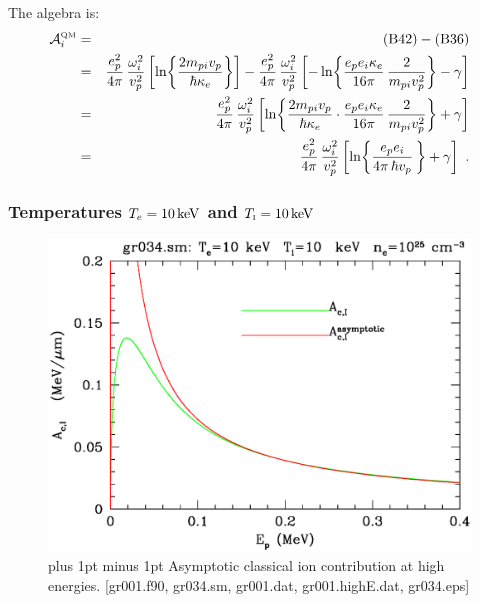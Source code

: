 \documentclass[preprint,12pt,eqsecnum,nofootinbib,amsmath,amssymb]{revtex4}
\newcommand{\smI}{{\rm\scriptscriptstyle I}}
\newcommand{\smQM}{{\rm\scriptscriptstyle QM}}
\newcommand{\footnoteskip}{\baselineskip 12pt plus 1pt minus 1pt}
\begin{document}
The algebra is:
\begin{eqnarray}
  {\cal A}^\smQM_i
  &=& {\rm (B42)} - {\rm (B36)}
\\
  &=&
  \frac{e_p^2}{4\pi}\,\frac{\omega_i^2}{v_p^2}\left[
  \ln\!\left\{\frac{2 m_{pi} v_p}{\hbar \kappa_e} \right\}
  \right]
  -
  \frac{e_p^2}{4\pi}\,\frac{\omega_i^2}{v_p^2}\left[
  -\ln\!\left\{\frac{e_p e_i \kappa_e}{16\pi}\,
  \frac{2}{m_{pi} v_p^2} \right\}
  -\gamma
  \right]
\\
  &=&
  \frac{e_p^2}{4\pi}\,\frac{\omega_i^2}{v_p^2}\left[
  \ln\!\left\{\frac{2 m_{pi} v_p}{\hbar \kappa_e} \cdot
  \frac{e_p e_i \kappa_e}{16\pi}\,
  \frac{2}{m_{pi} v_p^2} \right\}
  +\gamma
  \right]
\\
  &=&
  \frac{e_p^2}{4\pi}\,\frac{\omega_i^2}{v_p^2}\left[
  \ln\!\left\{
  \frac{e_p e_i}{4\pi\, \hbar v_p}\,
  \right\}
  +\gamma
  \right] \ .
\end{eqnarray}


\pagebreak
\subsubsection{Temperatures $T_e=10\,{\rm keV}$ and $T_\smI=10\,{\rm keV}$}

\vskip-2cm 
\begin{figure}[h!]
\includegraphics[scale=0.45]{gr034.eps} 
\vskip-0.8cm 
\caption{\footnoteskip  
  Asymptotic classical ion contribution at high energies. [gr001.f90,
  gr034.sm, gr001.dat, gr001.highE.dat, gr034.eps]
}
\label{fig:gr034}
\end{figure}
\end{document}
